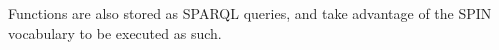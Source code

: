 \documentclass[]{interact}
\theoremstyle{plain}%
\theoremstyle{definition}
\theoremstyle{remark}
\theoremstyle{definition}
\begin{document}
Functions are also stored as SPARQL queries, and take advantage of the SPIN vocabulary to be executed as such.
%


%
%
%
\end{document}
